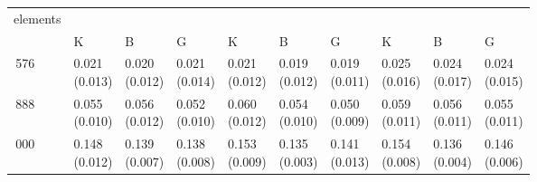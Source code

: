 \begin{table}[H]\centering\begin{tabular}{>{\centering\arraybackslash}m{1.2cm}|>{\centering\arraybackslash}m{1.25cm}>{\centering\arraybackslash}m{1.25cm}>{\centering\arraybackslash}m{1.25cm}|>{\centering\arraybackslash}m{1.25cm}>{\centering\arraybackslash}m{1.25cm}>{\centering\arraybackslash}m{1.25cm}|>{\centering\arraybackslash}m{1.25cm}>{\centering\arraybackslash}m{1.25cm}>{\centering\arraybackslash}m{1.25cm}}
\toprule
elements & \multicolumn{3}{|c}{gravity} & \multicolumn{3}{|c}{traction} & \multicolumn{3}{|c}{compression} \\
 & K & B & G & K & B & G & K & B & G \\
\midrule
24\,576 & \makecell{0.021\\[-4pt](0.013)} & \makecell{0.020\\[-4pt](0.012)} & \makecell{0.021\\[-4pt](0.014)} & \makecell{0.021\\[-4pt](0.012)} & \makecell{0.019\\[-4pt](0.012)} & \makecell{0.019\\[-4pt](0.011)} & \makecell{0.025\\[-4pt](0.016)} & \makecell{0.024\\[-4pt](0.017)} & \makecell{0.024\\[-4pt](0.015)} \\
63\,888 & \makecell{0.055\\[-4pt](0.010)} & \makecell{0.056\\[-4pt](0.012)} & \makecell{0.052\\[-4pt](0.010)} & \makecell{0.060\\[-4pt](0.012)} & \makecell{0.054\\[-4pt](0.010)} & \makecell{0.050\\[-4pt](0.009)} & \makecell{0.059\\[-4pt](0.011)} & \makecell{0.056\\[-4pt](0.011)} & \makecell{0.055\\[-4pt](0.011)} \\
162\,000 & \makecell{0.148\\[-4pt](0.012)} & \makecell{0.139\\[-4pt](0.007)} & \makecell{0.138\\[-4pt](0.008)} & \makecell{0.153\\[-4pt](0.009)} & \makecell{0.135\\[-4pt](0.003)} & \makecell{0.141\\[-4pt](0.013)} & \makecell{0.154\\[-4pt](0.008)} & \makecell{0.136\\[-4pt](0.004)} & \makecell{0.146\\[-4pt](0.006)} \\

\end{tabular}
\end{table}
